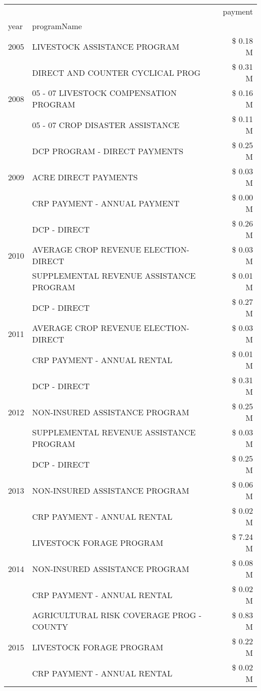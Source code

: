 \begin{tabular}{llr}
\toprule
 &  & payment \\
year & programName &  \\
\midrule
2005 & LIVESTOCK ASSISTANCE PROGRAM & \$ 0.18 M \\
\cline{1-3}
\multirow[t]{3}{*}{2008} & DIRECT AND COUNTER CYCLICAL PROG & \$ 0.31 M \\
 & 05 - 07 LIVESTOCK COMPENSATION PROGRAM & \$ 0.16 M \\
 & 05 - 07 CROP DISASTER ASSISTANCE & \$ 0.11 M \\
\cline{1-3}
\multirow[t]{3}{*}{2009} & DCP PROGRAM - DIRECT PAYMENTS & \$ 0.25 M \\
 & ACRE DIRECT PAYMENTS & \$ 0.03 M \\
 & CRP PAYMENT - ANNUAL PAYMENT & \$ 0.00 M \\
\cline{1-3}
\multirow[t]{3}{*}{2010} & DCP - DIRECT & \$ 0.26 M \\
 & AVERAGE CROP REVENUE ELECTION-DIRECT & \$ 0.03 M \\
 & SUPPLEMENTAL REVENUE ASSISTANCE PROGRAM & \$ 0.01 M \\
\cline{1-3}
\multirow[t]{3}{*}{2011} & DCP - DIRECT & \$ 0.27 M \\
 & AVERAGE CROP REVENUE ELECTION-DIRECT & \$ 0.03 M \\
 & CRP PAYMENT - ANNUAL RENTAL & \$ 0.01 M \\
\cline{1-3}
\multirow[t]{3}{*}{2012} & DCP - DIRECT & \$ 0.31 M \\
 & NON-INSURED ASSISTANCE PROGRAM & \$ 0.25 M \\
 & SUPPLEMENTAL REVENUE ASSISTANCE PROGRAM & \$ 0.03 M \\
\cline{1-3}
\multirow[t]{3}{*}{2013} & DCP - DIRECT & \$ 0.25 M \\
 & NON-INSURED ASSISTANCE PROGRAM & \$ 0.06 M \\
 & CRP PAYMENT - ANNUAL RENTAL & \$ 0.02 M \\
\cline{1-3}
\multirow[t]{3}{*}{2014} & LIVESTOCK FORAGE PROGRAM & \$ 7.24 M \\
 & NON-INSURED ASSISTANCE PROGRAM & \$ 0.08 M \\
 & CRP PAYMENT - ANNUAL RENTAL & \$ 0.02 M \\
\cline{1-3}
\multirow[t]{3}{*}{2015} & AGRICULTURAL RISK COVERAGE PROG - COUNTY & \$ 0.83 M \\
 & LIVESTOCK FORAGE PROGRAM & \$ 0.22 M \\
 & CRP PAYMENT - ANNUAL RENTAL & \$ 0.02 M \\

\end{tabular}
